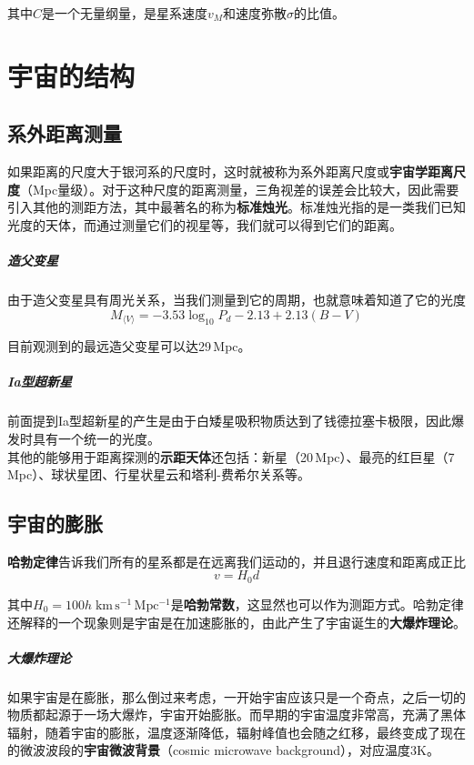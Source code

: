 \documentclass[openany]{ctexbook}
\begin{document}
其中$C$是一个无量纲量，是星系速度$v_M$和速度弥散$\sigma$的比值。

\chapter{宇宙的结构}
\section{系外距离测量}
如果距离的尺度大于银河系的尺度时，这时就被称为系外距离尺度或\textbf{宇宙学距离尺度}（Mpc量级）。对于这种尺度的距离测量，三角视差的误差会比较大，因此需要引入其他的测距方法，其中最著名的称为\textbf{标准烛光}。标准烛光指的是一类我们已知光度的天体，而通过测量它们的视星等，我们就可以得到它们的距离。

\paragraph{造父变星}
由于造父变星具有周光关系，当我们测量到它的周期，也就意味着知道了它的光度
\begin{equation}
  M_{\langle V\rangle}=-3.53\log_{10}P_d-2.13+2.13(B-V)
\end{equation}

目前观测到的最远造父变星可以达29\,Mpc。

\paragraph{Ia型超新星}
前面提到Ia型超新星的产生是由于白矮星吸积物质达到了钱德拉塞卡极限，因此爆发时具有一个统一的光度。\mbox{}\\

其他的能够用于距离探测的\textbf{示距天体}还包括：新星（20\,Mpc）、最亮的红巨星（7\,Mpc）、球状星团、行星状星云和塔利-费希尔关系等。

\section{宇宙的膨胀}
\textbf{哈勃定律}告诉我们所有的星系都是在远离我们运动的，并且退行速度和距离成正比
\begin{equation}
  v=H_0d
\end{equation}

其中$H_0=100h\;\mathrm{km\,s^{-1}\,Mpc^{-1}}$是\textbf{哈勃常数}，这显然也可以作为测距方式。哈勃定律还解释的一个现象则是宇宙是在加速膨胀的，由此产生了宇宙诞生的\textbf{大爆炸理论}。

\paragraph{大爆炸理论}
如果宇宙是在膨胀，那么倒过来考虑，一开始宇宙应该只是一个奇点，之后一切的物质都起源于一场大爆炸，宇宙开始膨胀。而早期的宇宙温度非常高，充满了黑体辐射，随着宇宙的膨胀，温度逐渐降低，辐射峰值也会随之红移，最终变成了现在的微波波段的\textbf{宇宙微波背景}（cosmic microwave background），对应温度3\;K。
\end{document}
